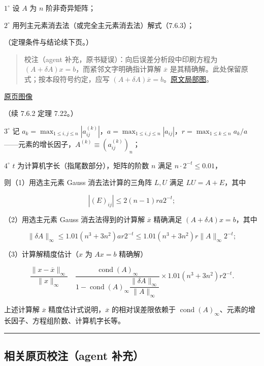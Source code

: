 \documentclass[
  10pt,
  fontset=fandol]{ctexart}
\begin{document}
\(1^\circ\) 设 \(A\) 为 \(n\) 阶非奇异矩阵；

\(2^\circ\) 用列主元素消去法（或完全主元素消去法）解式（7.6.3）；

（定理条件与结论续下页。）

\begin{quote}
校注（agent 补充，原书疑误）：向后误差分析段中印刷方程为 \((A+\delta A)x=b\)，而紧邻文字明确指计算解 \(\overline x\) 是其精确解。此处保留原式；按本段符号约定，应写 \((A+\delta A)\overline x=b\)。\href{../assets/ch07b/210-backward-error.png}{原文局部图}。
\end{quote}

\href{../../source-images/pdf-211.jpeg}{原页图像}

（续 7.6.2 定理 7.22。）

\(3^\circ\) 记 \(a_k=\max_{1\leqslant i,j\leqslant n}|a_{ij}^{(k)}|\)，\(a=\max_{1\leqslant i,j\leqslant n}|a_{ij}|\)，\(r=\max_{1\leqslant k\leqslant n}a_k/a\)------元素的增长因子，\(A^{(k)}\equiv(a_{ij}^{(k)})_n\)；

\(4^\circ\) \(t\) 为计算机字长（指尾数部分），矩阵的阶数 \(n\) 满足 \(n\cdot2^{-t}\leqslant0.01\)，

则（1）用选主元素 Gauss 消去法计算的三角阵 \(L,U\) 满足 \(LU=A+E\)，其中

\[
|(E)_{ij}|\leqslant2(n-1)ra2^{-t};
\]

（2）用选主元素 Gauss 消去法得到的计算解 \(\overline x\) 精确满足 \((A+\delta A)x=b\)，其中

\[
\|\delta A\|_\infty\leqslant1.01(n^3+3n^2)ar2^{-t}\leqslant1.01(n^3+3n^2)r\|A\|_\infty2^{-t};
\]

（3）计算解精度估计（\(x\) 为 \(Ax=b\) 精确解）

\[
\frac{\|x-\overline x\|_\infty}{\|x\|_\infty}
\quad
\frac{\operatorname{cond}(A)_\infty}
{1-\operatorname{cond}(A)_\infty\dfrac{\|\delta A\|_\infty}{\|A\|_\infty}}
\times1.01(n^3+3n^2)r2^{-t}.
\tag{7.6.14}
\]

上述计算解 \(\overline x\) 精度估计式说明，\(\overline x\) 的相对误差限依赖于 \(\operatorname{cond}(A)_\infty\)、元素的增长因子、方程组阶数、计算机字长等。

\begin{center}\rule{0.5\linewidth}{0.5pt}\end{center}

\subsection{相关原页校注（agent 补充）}\label{ux76f8ux5173ux539fux9875ux6821ux6ce8agent-ux8865ux5145}
\end{document}
